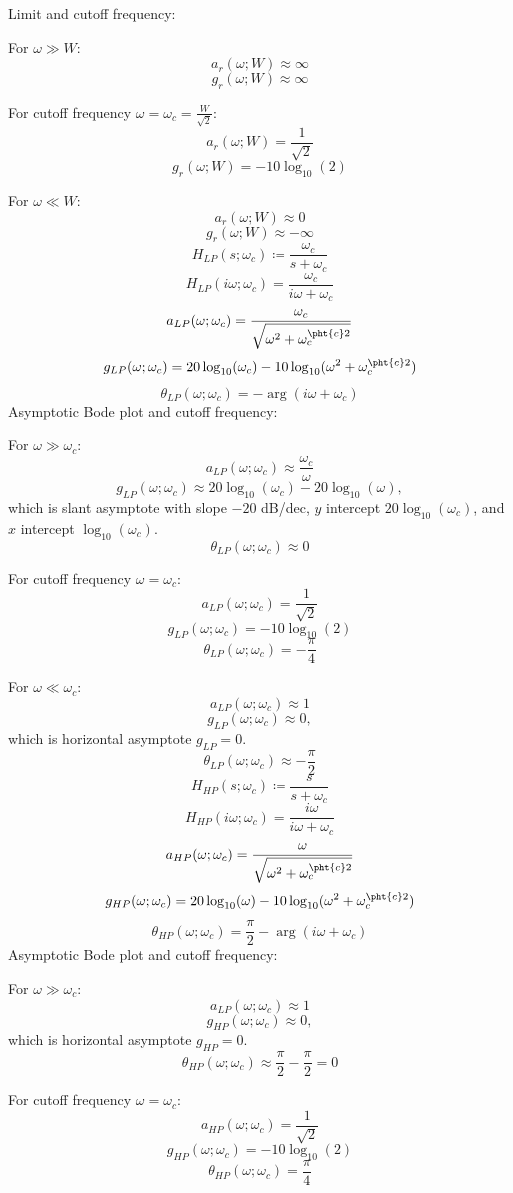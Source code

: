 \documentclass[a4paper,12pt]{report}
\begin{document}
Limit and cutoff frequency:
\bit
\item For $\omega\gg W$:
\[a_r(\omega;W)\approx\infty\]
\[g_r(\omega;W)\approx\infty\]
\item For cutoff frequency $\omega=\omega_c=\frac{W}{\sqrt{2}}$:
\[a_r(\omega;W)=\frac{1}{\sqrt{2}}\]
\[g_r(\omega;W)=-10\log_{10}(2)\]
\item For $\omega\ll W$:
\[a_r(\omega;W)\approx0\]
\[g_r(\omega;W)\approx-\infty\]
\eit
{}
\[H_{LP}(s;\omega_c)\coloneq\frac{\omega_c}{s+\omega_c}\]
\[H_{LP}(i\omega;\omega_c)=\frac{\omega_c}{i\omega+\omega_c}\]
\[a_{LP}(\omega;\omega_c)=\frac{\omega_c}{\sqrt{\omega^2+\omega_c^{\pht{c}2}}}\]
\[g_{LP}(\omega;\omega_c)=20\log_{10}(\omega_c)-10\log_{10}(\omega^2+\omega_c^{\pht{c}2})\]
\[\theta_{LP}(\omega;\omega_c)=-\arg(i\omega+\omega_c)\]
Asymptotic Bode plot and cutoff frequency:
\bit
\item For $\omega\gg \omega_c$:
\[a_{LP}(\omega;\omega_c)\approx\frac{\omega_c}{\omega}\]
\[g_{LP}(\omega;\omega_c)\approx 20\log_{10}(\omega_c)-20\log_{10}(\omega),\]
which is slant asymptote with slope $-20$ dB/dec, $y$ intercept $20\log_{10}(\omega_c)$, and $x$ intercept $\log_{10}(\omega_c)$.
\[\theta_{LP}(\omega;\omega_c)\approx0\]
\item For cutoff frequency $\omega=\omega_c$:
\[a_{LP}(\omega;\omega_c)=\frac{1}{\sqrt{2}}\]
\[g_{LP}(\omega;\omega_c)=-10\log_{10}(2)\]
\[\theta_{LP}(\omega;\omega_c)=-\frac{\pi}{4}\]
\item For $\omega\ll \omega_c$:
\[a_{LP}(\omega;\omega_c)\approx 1\]
\[g_{LP}(\omega;\omega_c)\approx 0,\]
which is horizontal asymptote $g_{LP}=0$.
\[\theta_{LP}(\omega;\omega_c)\approx-\frac{\pi}{2}\]
\eit
{}
\[H_{HP}(s;\omega_c)\coloneq\frac{s}{s+\omega_c}\]
\[H_{HP}(i\omega;\omega_c)=\frac{i\omega}{i\omega+\omega_c}\]
\[a_{HP}(\omega;\omega_c)=\frac{\omega}{\sqrt{\omega^2+\omega_c^{\pht{c}2}}}\]
\[g_{HP}(\omega;\omega_c)=20\log_{10}(\omega)-10\log_{10}(\omega^2+\omega_c^{\pht{c}2})\]
\[\theta_{HP}(\omega;\omega_c)=\frac{\pi}{2}-\arg(i\omega+\omega_c)\]
Asymptotic Bode plot and cutoff frequency:
\bit
\item For $\omega\gg \omega_c$:
\[a_{LP}(\omega;\omega_c)\approx 1\]
\[g_{HP}(\omega;\omega_c)\approx 0,\]
which is horizontal asymptote $g_{HP}=0$.
\[\theta_{HP}(\omega;\omega_c)\approx\frac{\pi}{2}-\frac{\pi}{2}=0\]
\item For cutoff frequency $\omega=\omega_c$:
\[a_{HP}(\omega;\omega_c)=\frac{1}{\sqrt{2}}\]
\[g_{HP}(\omega;\omega_c)=-10\log_{10}(2)\]
\[\theta_{HP}(\omega;\omega_c)=\frac{\pi}{4}\]
\end{document}
